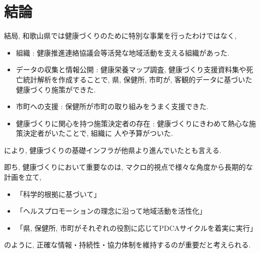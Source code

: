 \section{結論}
結局, 和歌山県では健康づくりのために特別な事業を行ったわけではなく,
\begin{itemize} \setlength{\itemsep}{-0.5mm} \setlength{\parskip}{-0.5mm}
	\item 組織 :  健康推進連絡協議会等活発な地域活動を支える組織があった.
	\item データの収集と情報公開 : 健康栄養マップ調査, 健康づくり支援資料集や死亡統計解析を作成することで, 県, 保健所, 市町が, 客観的データに基づいた健康づくり施策ができた.
	\item 市町への支援 : 保健所が市町の取り組みをうまく支援できた.
	\item 健康づくりに関心を持つ施策決定者の存在 : 健康づくりにきわめて熱心な施策決定者がいたことで, 組織に 人や予算がついた.
\end{itemize}
により, 健康づくりの基礎インフラが他県より進んでいたとも言える.

即ち, 健康づくりにおいて重要なのは, マクロ的視点で様々な角度から長期的な計画を立て,
\begin{itemize} \setlength{\itemsep}{-0.5mm} \setlength{\parskip}{-0.5mm}
	\item 「科学的根拠に基づいて」
	\item 「ヘルスプロモーションの理念に沿って地域活動を活性化」
	\item 「県, 保健所, 市町がそれぞれの役割に応じてPDCAサイクルを着実に実行」
\end{itemize}
のように, 正確な情報・持続性・協力体制を維持するのが重要だと考えられる.
